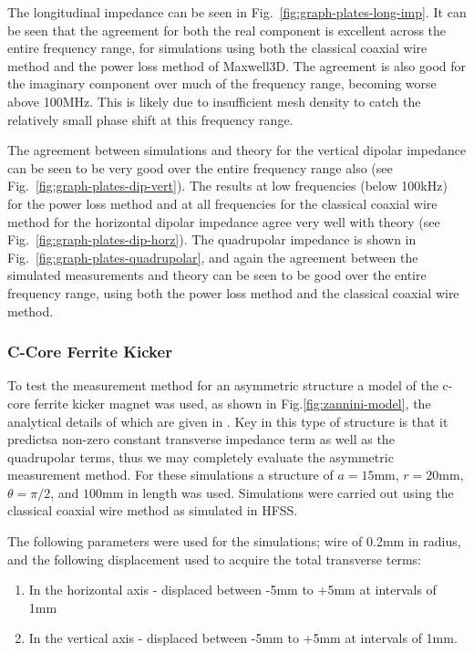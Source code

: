 The longitudinal impedance can be seen in Fig.~\ref{fig:graph-plates-long-imp}. It can be seen that the agreement for both the real component is excellent across the entire frequency range, for simulations using both the classical coaxial wire method and the power loss method of Maxwell3D. The agreement is also good for the imaginary component over much of the frequency range, becoming worse above 100MHz. This is likely due to insufficient mesh density to catch the relatively small phase shift at this frequency range.

The agreement between simulations and theory for the vertical dipolar impedance can be seen to be very good over the entire frequency range also (see Fig.~\ref{fig:graph-plates-dip-vert}). The results at low frequencies (below 100kHz) for the power loss method and at all frequencies for the classical coaxial wire method for the horizontal dipolar impedance agree very well with theory (see Fig.~\ref{fig:graph-plates-dip-horz}). The quadrupolar impedance is shown in Fig.~\ref{fig:graph-plates-quadrupolar}, and again the agreement between the simulated measurements and theory can be seen to be good over the entire frequency range, using both the power loss method and the classical coaxial wire method.

\subsubsection{C-Core Ferrite Kicker}

To test the measurement method for an asymmetric structure a model of the c-core ferrite kicker magnet was used, as shown in Fig.\ref{fig:zannini-model}, the analytical details of which are given in \cite{Zannini:cCoreFerrite}. Key in this type of structure is that it predictsa non-zero constant transverse impedance term as well as the quadrupolar terms, thus we may completely evaluate the asymmetric measurement method. For these simulations a structure of $a=15$mm, $r=20$mm, $\theta = \pi / 2$, and $100$mm in length was used. Simulations were carried out using the classical coaxial wire method as simulated in HFSS.

The following parameters were used for the simulations; wire of 0.2mm in radius, and the following displacement used to acquire the total transverse terms:

\begin{enumerate}
\item{In the horizontal axis -  displaced between -5mm to +5mm at intervals of 1mm}
\item{In the vertical axis - displaced between -5mm to +5mm at intervals of 1mm.}
\end{enumerate}

